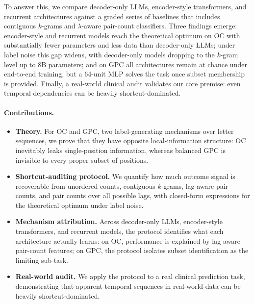 \documentclass{article} %
\theoremstyle{plain}
\theoremstyle{definition}
\theoremstyle{remark}
\begin{document}
To answer this, we compare decoder-only LLMs, encoder-style transformers, and recurrent architectures against a graded series of baselines that includes contiguous $k$-grams and $\lambda$-aware pair-count classifiers. Three findings emerge: encoder-style and recurrent models reach the theoretical optimum on OC with substantially fewer parameters and less data than decoder-only LLMs; under label noise this gap widens, with decoder-only models dropping to the $k$-gram level up to 8B parameters; and on GPC all architectures remain at chance under end-to-end training, but a 64-unit MLP solves the task once subset membership is provided. Finally, a real-world clinical audit validates our core premise: even temporal dependencies can be heavily shortcut-dominated.

\paragraph{Contributions.}
\begin{itemize}[leftmargin=*,itemsep=1pt,topsep=2pt]
\item \textbf{Theory.} For OC and GPC, two label-generating mechanisms over letter sequences, we prove that they have opposite local-information structure: OC inevitably leaks single-position information, whereas balanced GPC is invisible to every proper subset of positions.
\item \textbf{Shortcut-auditing protocol.} We quantify how much outcome signal is recoverable from unordered counts, contiguous $k$-grams, lag-aware pair counts, and pair counts over all possible lags, with closed-form expressions for the theoretical optimum under label noise.
\item \textbf{Mechanism attribution.} Across decoder-only LLMs, encoder-style transformers, and recurrent models, the protocol identifies what each architecture actually learns: on OC, performance is explained by lag-aware pair-count features; on GPC, the protocol isolates subset identification as the limiting sub-task.
\item \textbf{Real-world audit.} We apply the protocol to a real clinical prediction task, demonstrating that apparent temporal sequences in real-world data can be heavily shortcut-dominated.
\end{itemize}
\end{document}
